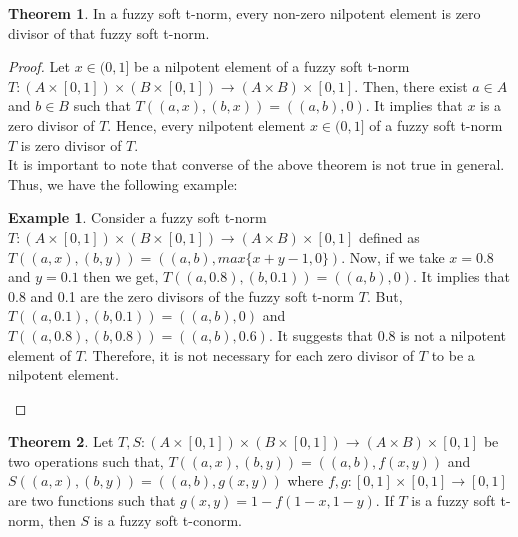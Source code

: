 \documentclass{article}
\theoremstyle{definition}
\newtheorem{theorem}{Theorem}[section]
\newtheorem{example}{Example}[section]
\begin{document}
\begin{theorem}
     In a fuzzy soft t-norm, every non-zero nilpotent element is zero divisor of that fuzzy soft t-norm.  
\end{theorem}
\begin{proof}
    Let $x\in (0, 1]$ be a nilpotent element of a fuzzy soft t-norm $T:(A\times[0, 1])\times (B\times[0, 1]) \to (A\times B)\times[0, 1]$. Then, there exist $a\in A$ and $b\in B$ such that $T((a, x), (b, x))=((a, b), 0)$. It implies that $x$ is a zero divisor of $T$. Hence, every nilpotent element $x\in (0, 1]$ of a fuzzy soft t-norm $T$ is zero divisor of $T$.\\

It is important to note that converse of the above theorem is not true in general. Thus, we have the following example:\\

 \begin{example}
      Consider a fuzzy soft t-norm $T:(A\times[0, 1])\times (B\times[0, 1]) \to (A\times B)\times[0, 1]$ defined as $T((a, x), (b, y))=((a, b), max\{x+y-1, 0\})$. Now, if we take $x=0.8$ and $y=0.1$ then we get, $T((a, 0.8), (b, 0.1))=((a, b), 0)$. It implies that 0.8 and 0.1 are the zero divisors of the fuzzy soft t-norm $T$. But, $T((a, 0.1), (b, 0.1))=((a, b), 0)$ and $T((a, 0.8), (b, 0.8))=((a, b), 0.6)$. It suggests that 0.8 is not a nilpotent element of $T$. Therefore, it is not necessary for each zero divisor of $T$ to be a nilpotent element.
 \end{example}  
\end{proof}
\begin{theorem}
    Let $T, S:(A\times[0, 1])\times (B\times[0, 1]) \to (A\times B)\times[0, 1]$ be two operations such that, $T((a, x), (b, y))=((a, b), f(x, y))$ and $S((a, x), (b, y))=((a, b), g(x, y))$ where $f, g:[0, 1]\times [0, 1] \to [0, 1]$  are two functions such that $g(x, y)=1-f(1-x, 1-y)$. If $T$ is a fuzzy soft t-norm, then $S$ is a fuzzy soft t-conorm.
\end{theorem}
\end{document}
